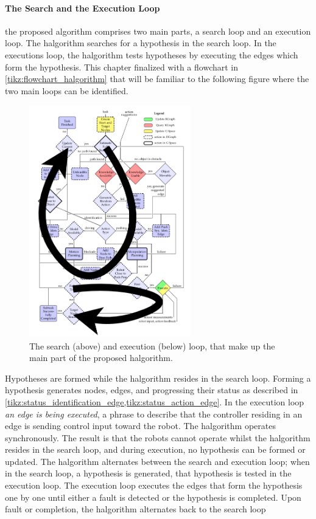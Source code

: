 \paragraph{The Search and the Execution Loop}
the proposed algorithm comprises two main parts, a search loop and an execution loop. The \ac{halgorithm} searches for a hypothesis in the search loop. In the executions loop, the \ac{halgorithm} tests hypotheses by executing the edges which form the hypothesis. This chapter finalized with a flowchart in \cref{tikz:flowchart_halgorithm} that will be familiar to the following figure where the two main loops can be identified.\bs

\begin{figure}[h]
    \centering
    \includegraphics[width=7cm]{figures/proposed_method/two_loops_identified}
    \caption{The search (above) and execution (below) loop, that make up the main part of the proposed \ac{halgorithm}.}%
    \label{fig:two_loops_identified}
\end{figure}

Hypotheses are formed while the \ac{halgorithm} resides in the search loop. Forming a hypothesis generates nodes, edges, and progressing their status as described in \cref{tikz:status_identification_edge,tikz:status_action_edge}. In the execution loop \textit{an edge is being executed}, a phrase to describe that the controller residing in an edge is sending control input toward the robot. The \ac{halgorithm} operates synchronously. The result is that the robots cannot operate whilst the \ac{halgorithm} resides in the search loop, and during execution, no hypothesis can be formed or updated. The \ac{halgorithm} alternates between the search and execution loop; when in the search loop, a hypothesis is generated, that hypothesis is tested in the execution loop. The execution loop executes the edges that form the hypothesis one by one until either a fault is detected or the hypothesis is completed. Upon fault or completion, the \ac{halgorithm} alternates back to the search loop\bs

